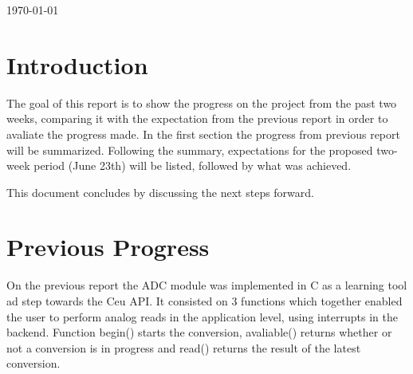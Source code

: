 \documentclass{article}
\begin{document}
\begin{titlepage}

{\large \today}\\[3cm] %


 

\vfill %

\end{titlepage}

\tableofcontents{}

\newpage

\section{Introduction}	


\tab The goal of this report is to show the progress on the project from the past two weeks, comparing it with the expectation from the previous report in order to avaliate the progress made. In the first section the progress from previous report will be summarized. Following the summary, expectations for the proposed two-week period (June 23th) will be listed, followed by what was achieved.
\par This document concludes by discussing the next steps forward.

\section{Previous Progress}
\tab On the previous report the ADC module was implemented in C as a learning tool ad step towards the Ceu API. It consisted on 3 functions which together enabled the user to perform analog reads in the application level, using interrupts in the backend. Function begin() starts the conversion, avaliable() returns whether or not a conversion is in progress and read() returns the result of the latest conversion.
\end{document}
